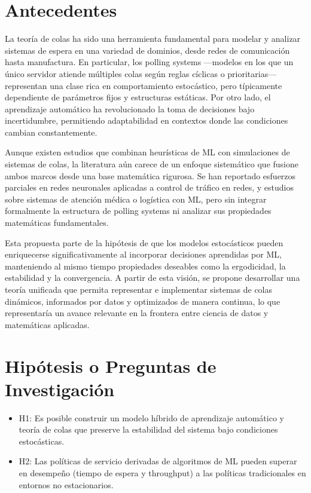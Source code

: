 \documentclass[12pt]{article}
\begin{document}
\section{Antecedentes}
La teoría de colas ha sido una herramienta fundamental para modelar y analizar sistemas de espera en una variedad de dominios, desde redes de comunicación hasta manufactura. En particular, los polling systems —modelos en los que un único servidor atiende múltiples colas según reglas cíclicas o prioritarias— representan una clase rica en comportamiento estocástico, pero típicamente dependiente de parámetros fijos y estructuras estáticas. Por otro lado, el aprendizaje automático ha revolucionado la toma de decisiones bajo incertidumbre, permitiendo adaptabilidad en contextos donde las condiciones cambian constantemente.

Aunque existen estudios que combinan heurísticas de ML con simulaciones de sistemas de colas, la literatura aún carece de un enfoque sistemático que fusione ambos marcos desde una base matemática rigurosa. Se han reportado esfuerzos parciales en redes neuronales aplicadas a control de tráfico en redes, y estudios sobre sistemas de atención médica o logística con ML, pero sin integrar formalmente la estructura de polling systems ni analizar sus propiedades matemáticas fundamentales. 

Esta propuesta parte de la hipótesis de que los modelos estocásticos pueden enriquecerse significativamente al incorporar decisiones aprendidas por ML, manteniendo al mismo tiempo propiedades deseables como la ergodicidad, la estabilidad y la convergencia. A partir de esta visión, se propone desarrollar una teoría unificada que permita representar e implementar sistemas de colas dinámicos, informados por datos y optimizados de manera continua, lo que representaría un avance relevante en la frontera entre ciencia de datos y matemáticas aplicadas.

\section{Hipótesis o Preguntas de Investigación}
\begin{itemize}
  \item H1: Es posible construir un modelo híbrido de aprendizaje automático y teoría de colas que preserve la estabilidad del sistema bajo condiciones estocásticas.
  \item H2: Las políticas de servicio derivadas de algoritmos de ML pueden superar en desempeño (tiempo de espera y throughput) a las políticas tradicionales en entornos no estacionarios.
\end{itemize}
\end{document}
